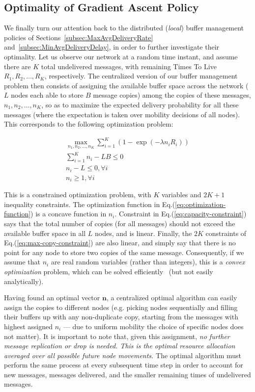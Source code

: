 \subsection{Optimality of Gradient Ascent Policy}
\label{OptimalityOfGradientPolicy}

We finally turn our attention back to the distributed (\emph{local}) buffer management policies of Sections~\ref{subsec:MaxAvgDeliveryRate} and~\ref{subsec:MinAvgDeliveryDelay}, in order to further investigate their optimality. Let us observe our network at a random time instant, and assume there are $K$ total undelivered messages, with remaining Times To Live $R_{1}, R_{2}, \dots, R_{K}$, respectively. The centralized version of our buffer management problem then consists of assigning the available buffer space across the network ($L$ nodes each able to store $B$ message copies) among the copies of these messages, $n_{1}, n_{2}, \dots, n_{K}$, so as to maximize the expected delivery probability for all these messages (where the expectation is taken over mobility decisions of all nodes). This corresponds to the following optimization problem:

\begin{eqnarray}
\underset{n_{1},n_{2},\dots,n_{K}}{\max} \sum_{i=1}^{K} (1-\exp(-\lambda n_i R_i)) \label{eq:optimization-function} \\
\sum_{i=1}^{K} n_{i} - L B \le 0 \label{eq:capacity-constraint} \\
n_{i} - L  \le 0, \forall i \label{eq:max-copy-constraint} \\
n_{i} \geq 1, \forall i \label{eq:min-copy-constraint}
\end{eqnarray}

This is a constrained optimization problem, with $K$ variables and $2K+1$ inequality constraints. The optimization function in Eq.(\ref{eq:optimization-function}) is a concave function in $n_{i}$. Constraint in Eq.(\ref{eq:capacity-constraint}) says that the total number of copies (for all messages) should not exceed the available buffer space in all $L$ nodes, and is linear. Finally, the $2K$ constraints of Eq.(\ref{eq:max-copy-constraint}) are also linear, and simply say that there is no point for any node to store two copies of the same message. Consequently, if we assume that $n_{i}$ are real random variables (rather than integers), this is a \emph{convex optimization} problem, which can be solved efficiently~\cite{Boyd:convex-optimization-book} (but not easily analytically).

Having found an optimal vector $\mathbf{n}$, a centralized optimal algorithm can easily assign the copies to different nodes (e.g. picking nodes sequentially and filling their buffers up with any non-duplicate copy, starting from the messages with highest assigned $n_{i}$ --- due to uniform mobility the choice of specific nodes does not matter). It is important to note that, given this assignment, \emph{no further message replication or drop is needed. This is the optimal resource allocation averaged over all possible future node movements.} The optimal algorithm must perform the same process at every subsequent time step in order to account for new messages, messages delivered, and the smaller remaining times of undelivered messages.


